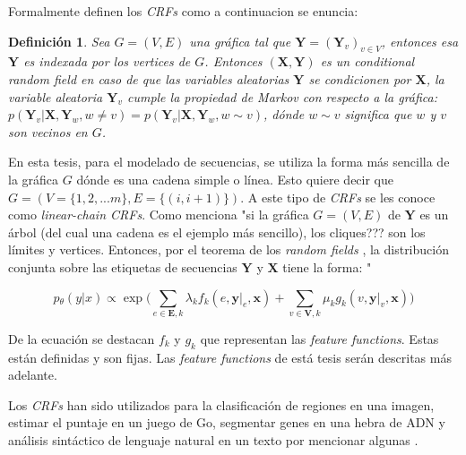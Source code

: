 \documentclass[letterpaper,12pt,oneside]{book}
\newtheorem{definition}{Definición}
\begin{document}
Formalmente \citet{lafferty2001conditional} definen los \textit{CRFs} como a continuacion se enuncia:

\begin{definition}
	Sea $G = (V,E)$ una gráfica tal que $\mathbf{Y} = (\mathbf{Y}_{v})_{v \in V}$, entonces esa $\mathbf{Y}$ es indexada por los vertices de $G$. Entonces $(\mathbf{X}, \mathbf{Y})$ es un \textsf{conditional random field} en caso de que las variables aleatorias $\mathbf{Y}$ se condicionen por $\mathbf{X}$, la variable aleatoria $\mathbf{Y}_{v}$ cumple la \textit{propiedad de Markov} con respecto a la gráfica: $p(\mathbf{Y}_{v}|\mathbf{X},\mathbf{Y}_{w},w \ne v) = p(\mathbf{Y}_{v}|\mathbf{X},\mathbf{Y}_{w},w \sim v)$, dónde $w \sim v$ significa que $w$ y $v$ son vecinos en $G$.
\end{definition}

En esta tesis, para el modelado de secuencias, se utiliza la forma más sencilla de la gráfica $G$ dónde es una cadena simple o línea. Esto quiere decir que $G = (V = \{1,2,...m\}, E = \{(i,i+1)\})$. A este tipo de \textit{CRFs} se les conoce como \textit{linear-chain CRFs}. Como menciona \citet{lafferty2001conditional} "si la gráfica $G = (V,E)$ de $\mathbf{Y}$ es un árbol (del cual una cadena es el ejemplo más sencillo), los cliques??? son los límites y vertices. Entonces, por el teorema de los \textit{random fields} \citep{hammersley1971markov}, la distribución conjunta sobre las etiquetas de secuencias $\mathbf{Y}$ y $\mathbf{X}$ tiene la forma: "


\begin{equation}
p{_{\theta}}(y|x) \propto \exp \bigg( \sum\limits_{e \in \mathbf{E},k} \lambda_{k}f_{k}(e,\mathbf{y}|_{e},\mathbf{x}) + \sum\limits_{v \in \mathbf{V},k}\mu_{k}g_{k}(v,\mathbf{y}|_{v},\mathbf{x}) \bigg)
\end{equation}


De la ecuación  se destacan $f_{k}$ y $g_{k}$ que representan las \textit{feature functions}. Estas están definidas y son fijas. Las \textit{feature functions} de está tesis serán descritas más adelante. %


Los \textit{CRFs} han sido utilizados para la clasificación de regiones en una imagen, estimar el puntaje en un juego de Go, segmentar genes en una hebra de ADN y análisis sintáctico de lenguaje natural en un texto por mencionar algunas \citep{sutton2012introduction}.
\end{document}
